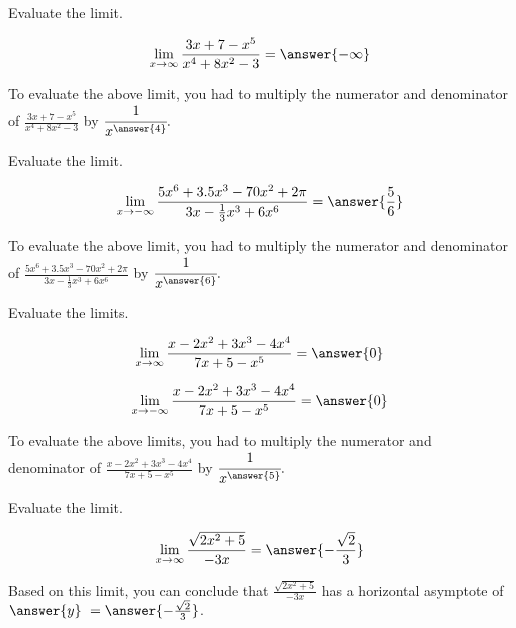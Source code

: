 \documentclass[handout]{ximera}
\begin{document}
\begin{exercise}

Evaluate the limit. 

\[ \displaystyle\lim_{x \to \infty} \frac{3x +7 - x^5}{x^4 + 8x^2 -3} = \answer{-\infty} \]

\begin{exercise}

To evaluate the above limit, you had to multiply the numerator and denominator of $\frac{3x +7 - x^5}{x^4 + 8x^2 -3}$ by $\cfrac{1}{x^{\answer{4}}}.$

\end{exercise}

\end{exercise}

\begin{exercise}

Evaluate the limit. 

\[ \displaystyle\lim_{x \to -\infty} \frac{5x^6 + 3.5x^3 -70x^2 + 2\pi}{3x - \frac{1}{3}x^3+ 6x^6} = \answer{\frac{5}{6}} \]

\begin{exercise}

To evaluate the above limit, you had to multiply the numerator and denominator of $\frac{5x^6 + 3.5x^3 -70x^2 + 2\pi}{3x - \frac{1}{3}x^3+ 6x^6}$ by $\cfrac{1}{x^{\answer{6}}}.$

\end{exercise}

\end{exercise}

\begin{exercise}

Evaluate the limits. 

\[ \displaystyle\lim_{x \to \infty} \frac{x - 2x^2 + 3x^3 -4x^4}{7x+5-x^5} = \answer{0} \]

\[ \displaystyle\lim_{x \to -\infty} \frac{x - 2x^2 + 3x^3 -4x^4}{7x+5-x^5} = \answer{0} \]

\begin{exercise}

To evaluate the above limits, you had to multiply the numerator and denominator of $\frac{x - 2x^2 + 3x^3 -4x^4}{7x+5-x^5}$ by $\cfrac{1}{x^{\answer{5}}}.$

\end{exercise}

\end{exercise}

\begin{exercise}

Evaluate the limit. 

\[ \displaystyle\lim_{x \to \infty} \frac{\sqrt{2x^2+5}}{-3x} = \answer{-\frac{\sqrt{2}}{3}} \]

\begin{exercise}

Based on this limit, you can conclude that $\frac{\sqrt{2x^2+5}}{-3x}$ has a horizontal asymptote of $\answer{y} \ = \answer{-\frac{\sqrt{2}}{3}}$.

\end{exercise}

\end{exercise}
\end{document}
